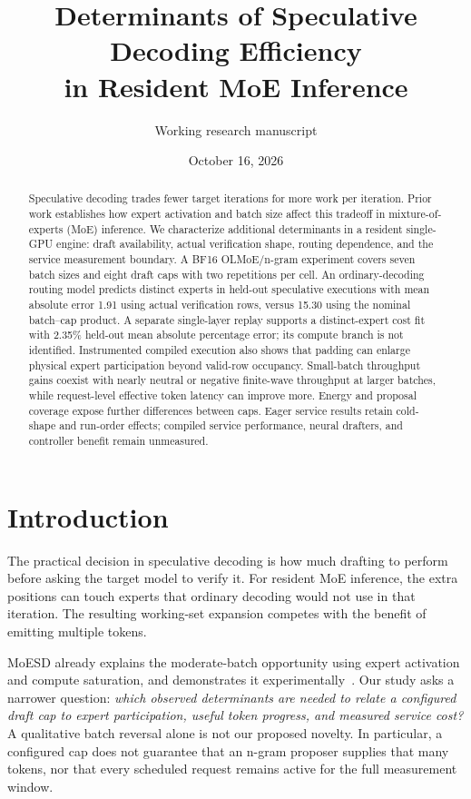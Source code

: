 \documentclass[10pt,twocolumn]{article}
\title{Determinants of Speculative Decoding Efficiency\\in Resident MoE Inference}
\author{Working research manuscript}
\date{October 16, 2026}
\begin{document}
\maketitle
\begin{abstract}
Speculative decoding trades fewer target iterations for more work per iteration. Prior work establishes how expert activation and batch size affect this tradeoff in mixture-of-experts (MoE) inference. We characterize additional determinants in a resident single-GPU engine: draft availability, actual verification shape, routing dependence, and the service measurement boundary. A BF16 OLMoE/n-gram experiment covers seven batch sizes and eight draft caps with two repetitions per cell. An ordinary-decoding routing model predicts distinct experts in held-out speculative executions with mean absolute error 1.91 using actual verification rows, versus 15.30 using the nominal batch--cap product. A separate single-layer replay supports a distinct-expert cost fit with 2.35\% held-out mean absolute percentage error; its compute branch is not identified. Instrumented compiled execution also shows that padding can enlarge physical expert participation beyond valid-row occupancy. Small-batch throughput gains coexist with nearly neutral or negative finite-wave throughput at larger batches, while request-level effective token latency can improve more. Energy and proposal coverage expose further differences between caps. Eager service results retain cold-shape and run-order effects; compiled service performance, neural drafters, and controller benefit remain unmeasured.
\end{abstract}

\section{Introduction}
The practical decision in speculative decoding is how much drafting to perform before asking the target model to verify it. For resident MoE inference, the extra positions can touch experts that ordinary decoding would not use in that iteration. The resulting working-set expansion competes with the benefit of emitting multiple tokens.

MoESD already explains the moderate-batch opportunity using expert activation and compute saturation, and demonstrates it experimentally~\cite{moesd}. Our study asks a narrower question: \emph{which observed determinants are needed to relate a configured draft cap to expert participation, useful token progress, and measured service cost?} A qualitative batch reversal alone is not our proposed novelty. In particular, a configured cap does not guarantee that an n-gram proposer supplies that many tokens, nor that every scheduled request remains active for the full measurement window.
\end{document}
